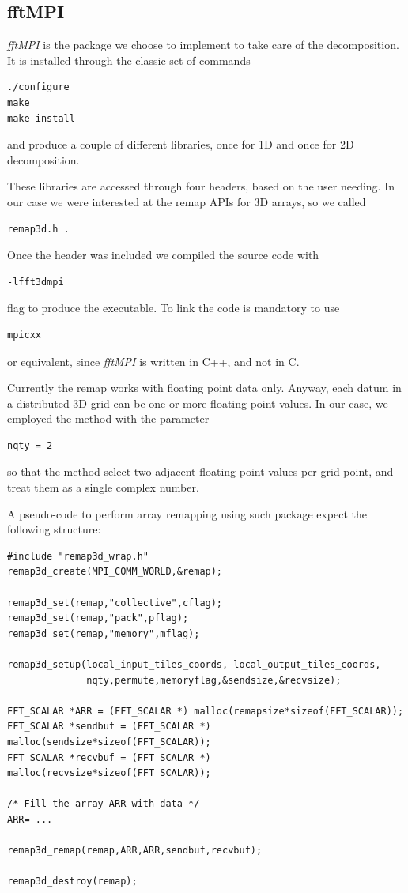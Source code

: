 \subsection{fftMPI}
\emph{fftMPI} is the package we choose to implement to take care of the decomposition. It is installed through the classic set of commands 
\begin{lstlisting}
./configure 
make 
make install
\end{lstlisting}
and produce a couple of different libraries, once for 1D and once for 2D decomposition.
\par
These libraries are accessed through four headers, based on the user needing. In our case we were interested at the remap APIs for 3D arrays, so we called 
\begin{lstlisting} 
remap3d.h .
\end{lstlisting}
Once the header was included we compiled the source code with 
\begin{lstlisting}
-lfft3dmpi
\end{lstlisting}
flag to produce the executable. To link the code is mandatory to use 
\begin{lstlisting}
mpicxx
\end{lstlisting}
or equivalent, since \emph{fftMPI} is written in C++, and not in C. \\
\par
Currently the remap works with floating point data only. Anyway, each datum in a distributed 3D grid can be one or more floating point values. In our case, we employed the method with the parameter
\begin{lstlisting}
nqty = 2
\end{lstlisting}
so that the method select two adjacent floating point values per grid point, and treat them as a single complex number. \\
\par
A pseudo-code to perform array remapping using such package expect the following structure:
\begin{lstlisting}
#include "remap3d_wrap.h" 
remap3d_create(MPI_COMM_WORLD,&remap);

remap3d_set(remap,"collective",cflag);
remap3d_set(remap,"pack",pflag);
remap3d_set(remap,"memory",mflag); 

remap3d_setup(local_input_tiles_coords, local_output_tiles_coords,
              nqty,permute,memoryflag,&sendsize,&recvsize); 
              
FFT_SCALAR *ARR = (FFT_SCALAR *) malloc(remapsize*sizeof(FFT_SCALAR));
FFT_SCALAR *sendbuf = (FFT_SCALAR *) malloc(sendsize*sizeof(FFT_SCALAR));
FFT_SCALAR *recvbuf = (FFT_SCALAR *) malloc(recvsize*sizeof(FFT_SCALAR)); 

/* Fill the array ARR with data */
ARR= ...

remap3d_remap(remap,ARR,ARR,sendbuf,recvbuf); 

remap3d_destroy(remap); 
\end{lstlisting}
